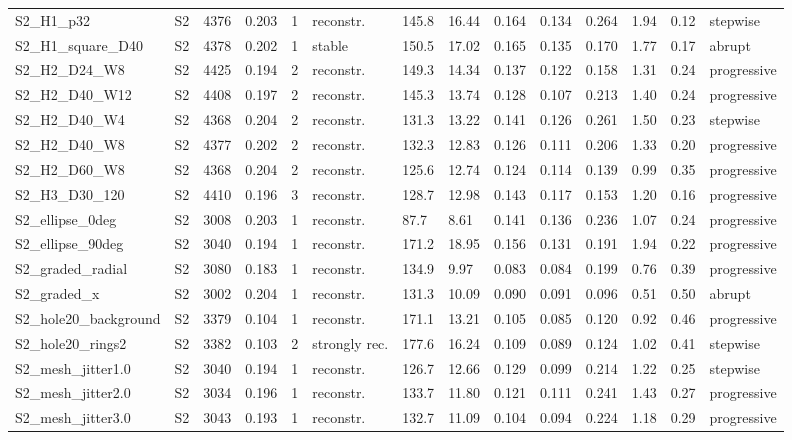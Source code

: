 \begin{landscape}
\begin{longtable}{llllllllllllll}
S2\_H1\_p32 & S2 & 4376 & 0.203 & 1 & reconstr. & 145.8 & 16.44 & 0.164 & 0.134 & 0.264 & 1.94 & 0.12 & stepwise\\
S2\_H1\_square\_D40 & S2 & 4378 & 0.202 & 1 & stable & 150.5 & 17.02 & 0.165 & 0.135 & 0.170 & 1.77 & 0.17 & abrupt\\
S2\_H2\_D24\_W8 & S2 & 4425 & 0.194 & 2 & reconstr. & 149.3 & 14.34 & 0.137 & 0.122 & 0.158 & 1.31 & 0.24 & progressive\\
S2\_H2\_D40\_W12 & S2 & 4408 & 0.197 & 2 & reconstr. & 145.3 & 13.74 & 0.128 & 0.107 & 0.213 & 1.40 & 0.24 & progressive\\
S2\_H2\_D40\_W4 & S2 & 4368 & 0.204 & 2 & reconstr. & 131.3 & 13.22 & 0.141 & 0.126 & 0.261 & 1.50 & 0.23 & stepwise\\
S2\_H2\_D40\_W8 & S2 & 4377 & 0.202 & 2 & reconstr. & 132.3 & 12.83 & 0.126 & 0.111 & 0.206 & 1.33 & 0.20 & progressive\\
S2\_H2\_D60\_W8 & S2 & 4368 & 0.204 & 2 & reconstr. & 125.6 & 12.74 & 0.124 & 0.114 & 0.139 & 0.99 & 0.35 & progressive\\
S2\_H3\_D30\_120 & S2 & 4410 & 0.196 & 3 & reconstr. & 128.7 & 12.98 & 0.143 & 0.117 & 0.153 & 1.20 & 0.16 & progressive\\
S2\_ellipse\_0deg & S2 & 3008 & 0.203 & 1 & reconstr. & 87.7 & 8.61 & 0.141 & 0.136 & 0.236 & 1.07 & 0.24 & progressive\\
S2\_ellipse\_90deg & S2 & 3040 & 0.194 & 1 & reconstr. & 171.2 & 18.95 & 0.156 & 0.131 & 0.191 & 1.94 & 0.22 & progressive\\
S2\_graded\_radial & S2 & 3080 & 0.183 & 1 & reconstr. & 134.9 & 9.97 & 0.083 & 0.084 & 0.199 & 0.76 & 0.39 & progressive\\
S2\_graded\_x & S2 & 3002 & 0.204 & 1 & reconstr. & 131.3 & 10.09 & 0.090 & 0.091 & 0.096 & 0.51 & 0.50 & abrupt\\
S2\_hole20\_background & S2 & 3379 & 0.104 & 1 & reconstr. & 171.1 & 13.21 & 0.105 & 0.085 & 0.120 & 0.92 & 0.46 & progressive\\
S2\_hole20\_rings2 & S2 & 3382 & 0.103 & 2 & strongly rec. & 177.6 & 16.24 & 0.109 & 0.089 & 0.124 & 1.02 & 0.41 & stepwise\\
S2\_mesh\_jitter1.0 & S2 & 3040 & 0.194 & 1 & reconstr. & 126.7 & 12.66 & 0.129 & 0.099 & 0.214 & 1.22 & 0.25 & stepwise\\
S2\_mesh\_jitter2.0 & S2 & 3034 & 0.196 & 1 & reconstr. & 133.7 & 11.80 & 0.121 & 0.111 & 0.241 & 1.43 & 0.27 & progressive\\
S2\_mesh\_jitter3.0 & S2 & 3043 & 0.193 & 1 & reconstr. & 132.7 & 11.09 & 0.104 & 0.094 & 0.224 & 1.18 & 0.29 & progressive\\

\end{longtable}
\end{landscape}
